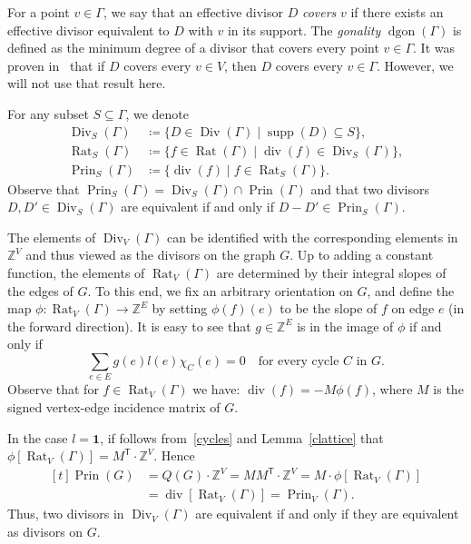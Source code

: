 \documentclass[ALCO,ThmDefs,Unicode,epreuves]{cedram}
\newcommand{\Z}{\ensuremath{\mathbb{Z}}}
\newcommand{\transp}{\mathsf{T}}
\newcommand{\one}{\ensuremath{\mathbf{1}}}
\DeclareMathOperator{\Div}{Div}
\DeclareMathOperator{\Rat}{Rat}
\DeclareMathOperator{\Prin}{Prin}
\DeclareMathOperator{\todiv}{div}
\DeclareMathOperator{\dgon}{dgon}
\DeclareMathOperator{\supp}{supp}
\begin{document}
For a point $v\in \Gamma$, we say that an effective divisor $D$ \emph{covers} $v$ if there exists an effective divisor equivalent to $D$ with $v$ in its support. The \emph{gonality} $\dgon(\Gamma)$ is defined as the minimum degree of a divisor that covers every point $v\in \Gamma$. It was proven in~\cite{Luo2011} that if $D$ covers every $v\in V$, then $D$ covers every $v\in \Gamma$. However, we will not use that result here.


For any subset $S\subseteq \Gamma$, we denote 
\begin{align}
\Div_S(\Gamma)&\coloneqq \{D\in \Div(\Gamma)\mid \supp(D)\subseteq S\},\\
\Rat_S(\Gamma)&\coloneqq \{f\in \Rat(\Gamma)\mid \todiv(f)\in \Div_S(\Gamma)\},\\
\Prin_S(\Gamma)&\coloneqq \{\todiv(f)\mid f\in \Rat_S(\Gamma)\}.
\end{align}
Observe that $\Prin_S(\Gamma)=\Div_S(\Gamma)\cap \Prin(\Gamma)$ and that two divisors $D,D'\in \Div_S(\Gamma)$ are equivalent if and only if $D-D'\in \Prin_S(\Gamma)$. 

The elements of $\Div_V(\Gamma)$ can be identified with the corresponding elements in $\Z^V$ and thus viewed as the divisors on the graph $G$. Up to adding a constant function, the elements of $\Rat_V(\Gamma)$ are determined by their integral slopes of the edges of $G$. To this end, we fix an arbitrary orientation on $G$, and define the map $\phi:\Rat_V(\Gamma)\to \Z^E$ by setting $\phi(f)(e)$ to be the slope of $f$ on edge $e$ (in the forward direction). It is easy to see that $g\in \Z^E$ is in the image of $\phi$ if and only if
\begin{equation}\label{cycles}
\sum_{e\in E} g(e)l(e)\chi_C(e)=0\quad \text{for every cycle $C$ in $G$}.
\end{equation} 
Observe that for $f\in\Rat_V(\Gamma)$ we have: $\todiv(f)=-M \phi(f)$, where $M$ is the signed vertex-edge incidence matrix of $G$. 

In the case $l=\one$, if follows from~\eqref{cycles} and Lemma~\ref{clattice} that $\phi\left[\Rat_V(\Gamma)\right]=M^\transp\cdot\Z^V$. Hence 
\begin{equation}
\begin{aligned}[t]
\Prin(G)&=Q(G)\cdot\Z^V=MM^{\transp}\cdot\Z^V=M\cdot\phi\left[\Rat_V(\Gamma)\right]\\
&=\todiv\left[\Rat_V(\Gamma)\right]=\Prin_V(\Gamma).
\end{aligned}
\end{equation}
Thus, two divisors in $\Div_V(\Gamma)$ are equivalent if and only if they are equivalent as divisors on $G$. 
\end{document}
